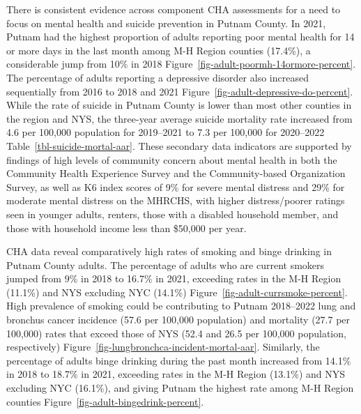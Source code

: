 \documentclass[
  english,
  letterpaper,
]{report}
\begin{document}
There is consistent evidence across component CHA assessments for a need
to focus on mental health and suicide prevention in Putnam County. In
2021, Putnam had the highest proportion of adults reporting poor mental
health for 14 or more days in the last month among M-H Region counties
(17.4\%), a considerable jump from 10\% in 2018
Figure~\ref{fig-adult-poormh-14ormore-percent}. The percentage of adults
reporting a depressive disorder also increased sequentially from 2016 to
2018 and 2021 Figure~\ref{fig-adult-depressive-do-percent}. While the
rate of suicide in Putnam County is lower than most other counties in
the region and NYS, the three-year average suicide mortality rate
increased from 4.6 per 100,000 population for 2019--2021 to 7.3 per
100,000 for 2020--2022 Table~\ref{tbl-suicide-mortal-aar}. These
secondary data indicators are supported by findings of high levels of
community concern about mental health in both the Community Health
Experience Survey and the Community-based Organization Survey, as well
as K6 index scores of 9\% for severe mental distress and 29\% for
moderate mental distress on the MHRCHS, with higher distress/poorer
ratings seen in younger adults, renters, those with a disabled household
member, and those with household income less than \$50,000 per year.

CHA data reveal comparatively high rates of smoking and binge drinking
in Putnam County adults. The percentage of adults who are current
smokers jumped from 9\% in 2018 to 16.7\% in 2021, exceeding rates in
the M-H Region (11.1\%) and NYS excluding NYC (14.1\%)
Figure~\ref{fig-adult-currsmoke-percent}. High prevalence of smoking
could be contributing to Putnam 2018--2022 lung and bronchus cancer
incidence (57.6 per 100,000 population) and mortality (27.7 per 100,000)
rates that exceed those of NYS (52.4 and 26.5 per 100,000 population,
respectively) Figure~\ref{fig-lungbronchca-incident-mortal-aar}.
Similarly, the percentage of adults binge drinking during the past month
increased from 14.1\% in 2018 to 18.7\% in 2021, exceeding rates in the
M-H Region (13.1\%) and NYS excluding NYC (16.1\%), and giving Putnam
the highest rate among M-H Region counties
Figure~\ref{fig-adult-bingedrink-percent}.
\end{document}

